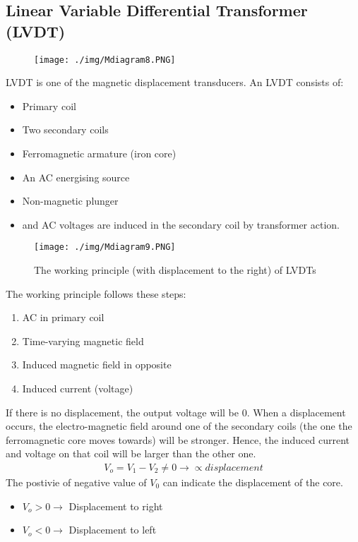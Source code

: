 \subsection{Linear Variable Differential Transformer (LVDT)}
\begin{figure}[H]
  \centering
  \texttt{[image: ./img/Mdiagram8.PNG]}
\end{figure}
LVDT is one of the magnetic displacement transducers. An LVDT consists of:
\begin{itemize}
  \item Primary coil
  \item Two secondary coils
  \item Ferromagnetic armature (iron core)
  \item An AC energising source
  \item Non-magnetic plunger
  \item and AC voltages are induced in the secondary coil by transformer action.
\end{itemize}
\begin{figure}[H]
  \centering
  \texttt{[image: ./img/Mdiagram9.PNG]}
  \caption{The working principle (with displacement to the right) of LVDTs}
\end{figure}
The working principle follows these steps:
\begin{enumerate}
  \item AC in primary coil
  \item Time-varying magnetic field
  \item Induced magnetic field in opposite
  \item Induced current (voltage)
\end{enumerate}
If there is no displacement, the output voltage will be 0. When a displacement occurs, the electro-magnetic field around one of the secondary coils (the one the ferromagnetic core moves towards) will be stronger. Hence, the induced current and voltage on that coil will be larger than the other one.
\begin{gather}
  V_o = V_1-V_2 \neq 0 \rightarrow \propto displacement
\end{gather}
The postivie of negative value of $V_0$ can indicate the displacement of the core.
\begin{itemize}
  \item $V_o>0 \longrightarrow$ Displacement to right
  \item $V_o<0 \longrightarrow$ Displacement to left
\end{itemize}
